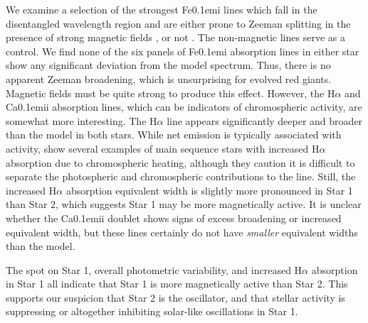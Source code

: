 We examine a selection of the strongest {\rm Fe}\kern 0.1em{\sc i} lines which fall in the disentangled wavelength region and are either prone to Zeeman splitting in the presence of strong magnetic fields \citep{har73}, or not \citep{sis70}. The non-magnetic lines serve as a control. We find none of the six panels of {\rm Fe}\kern 0.1em{\sc i} absorption lines in either star show any significant deviation from the model spectrum. Thus, there is no apparent Zeeman broadening, which is unsurprising for evolved red giants. Magnetic fields must be quite strong to produce this effect. However, the H$\alpha$ and {\rm Ca}\kern 0.1em{\sc ii} absorption lines, which can be indicators of chromospheric activity, are somewhat more interesting. The H$\alpha$ line appears significantly deeper and broader than the model in both stars. While net emission is typically associated with activity, \citet{rob90} show several examples of main sequence stars with increased H$\alpha$ absorption due to chromospheric heating, although they caution it is difficult to separate the photospheric and chromospheric contributions to the line. Still, the increased H$\alpha$ absorption equivalent width is slightly more pronounced in Star 1 than Star 2, which suggests Star 1 may be more magnetically active. It is unclear whether the {\rm Ca}\kern 0.1em{\sc ii} doublet shows signs of excess broadening or increased equivalent width, but these lines certainly do not have \emph{smaller} equivalent widths than the model.

The spot on Star 1, overall photometric variability, and increased H$\alpha$ absorption in Star 1 all indicate that Star 1 is more magnetically active than Star 2. This supports our suspicion that Star 2 is the oscillator, and that stellar activity is suppressing or altogether inhibiting solar-like oscillations in Star 1.